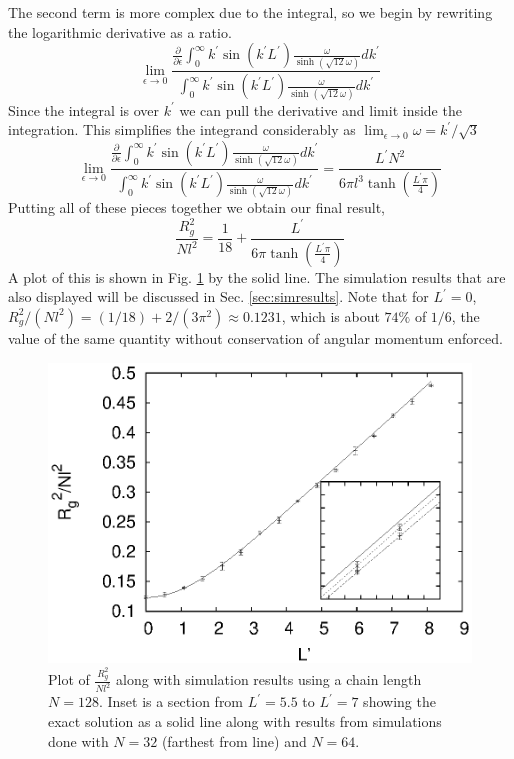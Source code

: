 \documentclass[11pt]{ucthesis}
\begin{document}
The second term is more complex due to the integral, so we begin by rewriting the logarithmic derivative as a ratio.
\begin{equation}
\lim_{\epsilon\to0} \frac{\frac{\partial}{\partial \epsilon}\int_0^\infty k^\prime \sin(k^\prime L^\prime) \frac{\omega}{\sinh(\sqrt{12}\omega)} dk^\prime}{\int_0^\infty k^\prime \sin(k^\prime L^\prime) \frac{\omega}{\sinh(\sqrt{12}\omega)} dk^\prime}
\end{equation}
Since the integral is over $k^\prime$ we can pull the derivative and limit inside the integration. This simplifies the integrand considerably as $\lim_{\epsilon\to0} \omega = k^\prime/\sqrt{3}$
\begin{equation}
\lim_{\epsilon\to0} \frac{\frac{\partial}{\partial \epsilon}\int_0^\infty k^\prime \sin(k^\prime L^\prime) \frac{\omega}{\sinh(\sqrt{12}\omega)} dk^\prime}{\int_0^\infty k^\prime \sin(k^\prime L^\prime) \frac{\omega}{\sinh(\sqrt{12}\omega)} dk^\prime}  = \frac{L^\prime N^2}{6\pi l^3\tanh(\frac{L^\prime \pi}{4}) }
\end{equation}
Putting all of these pieces together we obtain our final result,
\begin{equation}
\label{eq:finalresult}
\frac{R_g^2}{Nl^2} = \frac{1}{18} + \frac{L^\prime}{6\pi\tanh(\frac{L^\prime\pi}{4})}
\end{equation}
A plot of this is shown in Fig. \ref{fig:rgplot} by the solid line. The simulation results that are also displayed will be discussed in Sec. \ref{sec:simresults}.
Note that for $L^\prime = 0$, $R_g^2/(N l^2) = (1/18) + 2/(3 \pi^2) \approx 0.1231$, which is about $74\%$ of $1/6$, the value of the same
quantity without conservation of angular momentum enforced.
\begin{figure}
\begin{center}
\includegraphics[width=\hsize]{radius}
\caption{Plot of $\frac{R_g^2}{Nl^2}$ along with simulation results
using a chain length $N = 128$. Inset is a section from $L^\prime=5.5$
to $L^\prime=7$ showing the exact solution as a solid line along with results from simulations done with $N = 32$ (farthest from line)
and $N = 64$. }
\label{fig:rgplot}
\end{center}
\end{figure}
\end{document}
